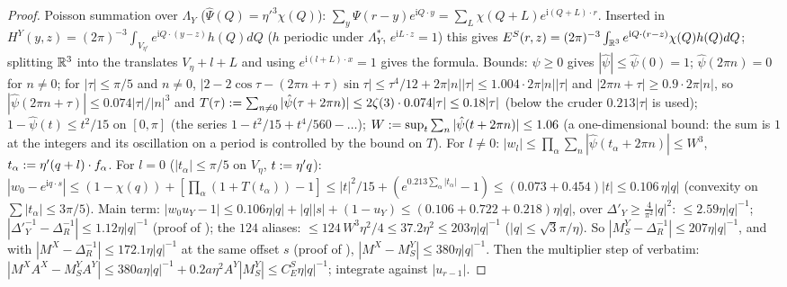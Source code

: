 \begin{proof}
Poisson summation over $\Lambda_Y$ ($\hat\Psi(Q)=\eta'^3\chi(Q)$): $\sum_y\Psi(r-y)e^{\mathrm iQ\cdot y}=\sum_L\chi(Q+L)e^{\mathrm i(Q+L)\cdot r}$. Inserted in $H^Y(y,z)=(2\pi)^{-3}\int_{V_{\eta'}}e^{\mathrm iQ\cdot(y-z)}h(Q)dQ$ ($h$ periodic under $\Lambda_Y^*$, $e^{\mathrm iL\cdot z}=1$) this gives $E^S(r,z)=(2\pi)^{-3}\int_{\mathbb R^3}e^{\mathrm iQ\cdot(r-z)}\chi(Q)h(Q)dQ$; splitting $\mathbb R^3$ into the translates $V_\eta+l+L$ and using $e^{\mathrm i(l+L)\cdot x}=1$ gives the formula. Bounds: $\psi\ge0$ gives $|\hat\psi|\le\hat\psi(0)=1$; $\hat\psi(2\pi n)=0$ for $n\ne0$; for $|\tau|\le\pi/5$ and $n\ne0$, $|2-2\cos\tau-(2\pi n+\tau)\sin\tau|\le\tau^4/12+2\pi|n||\tau|\le1.004\cdot2\pi|n||\tau|$ and $|2\pi n+\tau|\ge0.9\cdot2\pi|n|$, so $|\hat\psi(2\pi n+\tau)|\le0.074|\tau|/|n|^3$ and $T(\tau):=\sum_{n\ne0}|\hat\psi(\tau+2\pi n)|\le2\zeta(3)\cdot0.074|\tau|\le0.18|\tau|$ (below the cruder $0.213|\tau|$ is used); $1-\hat\psi(t)\le t^2/15$ on $[0,\pi]$ (the series $1-t^2/15+t^4/560-\dots$); $W:=\sup_t\sum_n|\hat\psi(t+2\pi n)|\le1.06$ (a one-dimensional bound: the sum is $1$ at the integers and its oscillation on a period is controlled by the bound on $T$). For $l\ne0$: $|w_l|\le\prod_\alpha\sum_n|\hat\psi(t_\alpha+2\pi n)|\le W^3$, $t_\alpha:=\eta'(q+l)\cdot f_\alpha$. For $l=0$ ($|t_\alpha|\le\pi/5$ on $V_\eta$, $t:=\eta'q$): $|w_0-e^{\mathrm iq\cdot s}|\le(1-\chi(q))+[\prod_\alpha(1+T(t_\alpha))-1]\le|t|^2/15+(e^{0.213\sum_\alpha|t_\alpha|}-1)\le(0.073+0.454)|t|\le0.106\,\eta|q|$ (convexity on $\sum|t_\alpha|\le3\pi/5$). Main term: $|w_0u_Y-1|\le0.106\eta|q|+|q||s|+(1-u_Y)\le(0.106+0.722+0.218)\eta|q|$, over $\Delta'_Y\ge\frac4{\pi^2}|q|^2$: $\le2.59\eta|q|^{-1}$; $|\Delta'^{-1}_Y-\Delta_R^{-1}|\le1.12\eta|q|^{-1}$ (proof of ); the $124$ aliases: $\le124\,W^3\eta^2/4\le37.2\eta^2\le203\eta|q|^{-1}$ ($|q|\le\sqrt3\pi/\eta$). So $|M^Y_S-\Delta_R^{-1}|\le207\eta|q|^{-1}$, and with $|M^X-\Delta_R^{-1}|\le172.1\eta|q|^{-1}$ at the same offset $s$ (proof of ), $|M^X-M^Y_S|\le380\eta|q|^{-1}$. Then the multiplier step of  verbatim: $|M^XA^X-M^Y_SA^Y|\le380a\eta|q|^{-1}+0.2a\eta^2A^Y|M^Y_S|\le C^S_E\eta|q|^{-1}$; integrate against $|u_{r-1}|$.
\end{proof}

